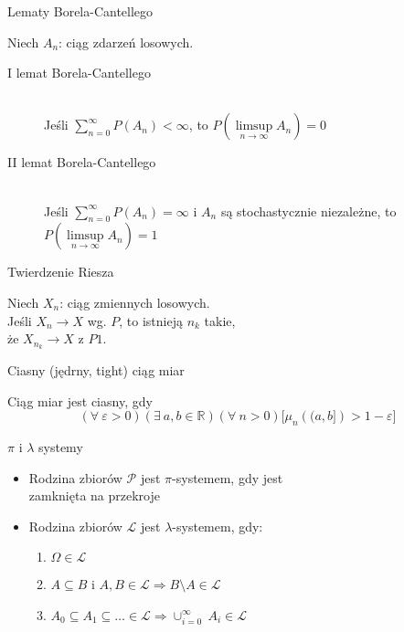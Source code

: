 \documentclass[avery5371,grid,frame]{flashcards}
\begin{document}


\begin{flashcard}[Twierdzenie]{Lematy Borela-Cantellego}

\smallskip
Niech $A_n$: ciąg zdarzeń losowych.
\begin{description}
\item[I lemat Borela-Cantellego] \hfill \\
	Jeśli $\sum_{n=0}^{\infty} P(A_n) < \infty$, to $P\left(\limsup\limits_{n \rightarrow \infty}{A_n}\right)=0$
\item[II lemat Borela-Cantellego] \hfill \\
	Jeśli $\sum_{n=0}^{\infty} P(A_n) = \infty$ i $A_n$ są stochastycznie niezależne, to $P\left(\limsup\limits_{n \rightarrow \infty}{A_n}\right)=1$ 
\end{description}
\end{flashcard}

\begin{flashcard}[Twierdzenie]{Twierdzenie Riesza}

\smallskip
Niech $X_n$: ciąg zmiennych losowych. \\ 
Jeśli $X_n \rightarrow X$ wg. $P$, to istnieją $n_k$ takie, \\
że $X_{n_k} \rightarrow X$ z $P1$.
\end{flashcard}

\begin{flashcard}[Definicja]{Ciasny (jędrny, tight) ciąg miar}

\smallskip
Ciąg miar jest ciasny, gdy
$$ (\forall \ \varepsilon > 0)(\exists \ a, b \in \mathbb{R})(\forall \ n > 0) \Big[\mu_n \left( (a,b] \right) > 1-\varepsilon \Big] $$
\end{flashcard}

\begin{flashcard}[Definicja]{$\pi$ i $\lambda$ systemy}

\smallskip
\begin{itemize}
\item Rodzina zbiorów $\mathcal{P}$ jest $\pi$-systemem, gdy jest \\
zamknięta na przekroje
\item Rodzina zbiorów $\mathcal{L}$ jest $\lambda$-systemem, gdy:
	\begin{enumerate}
	\item $\Omega \in \mathcal{L}$
	\item $A \subseteq B$ i $A, B \in \mathcal{L} \Rightarrow B \setminus A \in \mathcal{L}$
	\item $A_0 \subseteq A_1 \subseteq \ldots \in \mathcal{L} \Rightarrow \cup^{\infty}_{i=0} \ A_i \in \mathcal{L}$
	\end{enumerate}

\end{itemize}
\end{flashcard}
\end{document}
